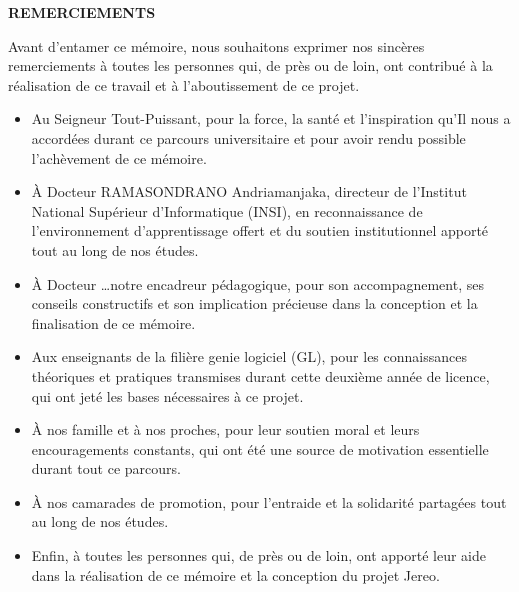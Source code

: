 \documentclass[12pt,a4paper]{report}
\begin{document}
    \tableofcontents
    
    

    \pagestyle{normalpage}

    \newpage
    \thispagestyle{empty}
    \mbox{}

    \newpage
    \fancyfoot[R]{\thepage}
    \setcounter{page}{1}
    \thispagestyle{normalpage}

        \begin{center}
            {\large\bfseries REMERCIEMENTS}\label{page:remerciements}
        \end{center}
    Avant d'entamer ce mémoire, nous souhaitons exprimer nos sincères remerciements à toutes les personnes qui, de près ou de loin, ont contribué à la réalisation de ce travail et à l'aboutissement de ce projet.
    \begin{itemize}
        \item Au Seigneur Tout-Puissant, pour la force, la santé et l'inspiration qu'Il nous a accordées durant ce parcours universitaire et pour avoir rendu possible l'achèvement de ce mémoire.
        
        \item À Docteur RAMASONDRANO Andriamanjaka, directeur de l'Institut National Supérieur d'Informatique (INSI), en reconnaissance de l'environnement d'apprentissage offert et du soutien institutionnel apporté tout au long de nos études.
        
        \item À Docteur \ldots notre encadreur pédagogique, pour son accompagnement, ses conseils constructifs et son implication précieuse dans la conception et la finalisation de ce mémoire.
        
        \item Aux enseignants de la filière genie logiciel (GL), pour les connaissances théoriques et pratiques transmises durant cette deuxième année de licence, qui ont jeté les bases nécessaires à ce projet.
        
        \item À nos famille et à nos proches, pour leur soutien moral et leurs encouragements constants, qui ont été une source de motivation essentielle durant tout ce parcours.
        
        \item À nos camarades de promotion, pour l'entraide et la solidarité partagées tout au long de nos études.
        
        \item Enfin, à toutes les personnes qui, de près ou de loin, ont apporté leur aide dans la réalisation de ce mémoire et la conception du projet Jereo.
    \end{itemize}
\end{document}

